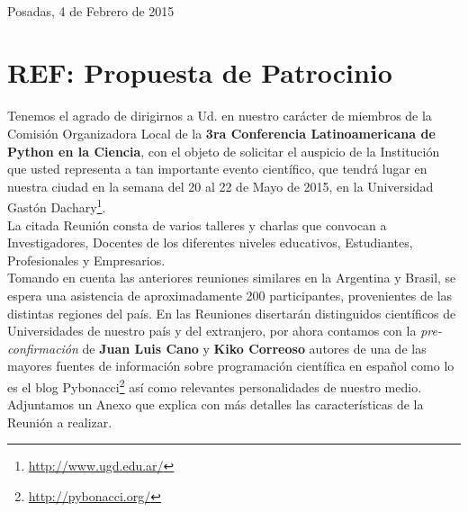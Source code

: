 \documentclass[11pt,a4paper]{report}
\begin{document}
\begin{center}
\end{center}



\hfill \\[0.2cm] Posadas, 4 de Febrero de 2015\\[0.4cm]

\section*{REF: Propuesta de Patrocinio}

Tenemos el agrado de dirigirnos a Ud. en nuestro carácter de miembros de la Comisión Organizadora Local de la
\textbf{3ra Conferencia Latinoamericana de Python en la Ciencia}, con el objeto de solicitar el auspicio de
la Institución que usted representa a tan importante evento científico, que tendrá lugar en nuestra ciudad en
la semana del 20 al 22 de Mayo de 2015, en la Universidad Gastón Dachary\footnote{\url{http://www.ugd.edu.ar/}}. \\

La citada Reunión consta de varios talleres y charlas  que convocan a
Investigadores, Docentes de los diferentes niveles educativos,
Estudiantes, Profesionales y Empresarios. \\[0.2cm]

Tomando en cuenta las anteriores reuniones similares en la Argentina y
Brasil, se espera una asistencia de aproximadamente 200 participantes,
provenientes de las distintas regiones del país. En las Reuniones
disertarán distinguidos científicos de Universidades de nuestro país y
del extranjero, por ahora contamos con la \emph{pre-confirmación} de
\textbf{Juan Luis Cano} y \textbf{Kiko Correoso} autores de una de las
mayores fuentes de información sobre programación científica en español
como lo es el blog Pybonacci\footnote{\url{http://pybonacci.org/}} así
como relevantes personalidades de nuestro medio. Adjuntamos un Anexo
que explica con más detalles las características de la
Reunión a realizar.\\[0.2cm]
\end{document}
